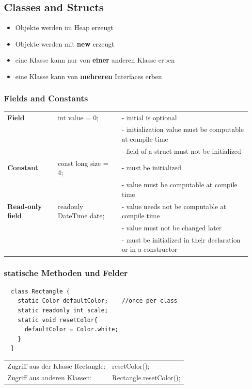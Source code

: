 \subsection{Classes and Structs}

\begin{itemize}
	\item Objekte werden im Heap erzeugt
	\item Objekte werden mit \textbf{new} erzeugt
	\item eine Klasse kann nur von \textbf{einer} anderen Klasse erben
	\item eine Klasse kann von \textbf{mehreren} Interfaces erben
\end{itemize}

\subsubsection{Fields and Constants}

\begin{tabular}{l|l|l}
	\textbf{Field}           & int value = 0;          & - initial is optional                                     \\
	                         &                         & - initialization value must be computable at compile time \\
	                         &                         & - field of a struct must not be initialized               \\ \hline
	\textbf{Constant}        & const long size = 4;     & - must be initialized                                     \\
	                         &                         & - value must be computable at compile time                \\ \hline
	\textbf{Read-only field} & readonly DateTime date; & - value needs not be computable at compile time           \\
	                         &                         & - value must not be changed later \\
	                         &                         & - must be initialized in their declaration or in a constructor \\
\end{tabular} 

\subsubsection{statische Methoden und Felder}
\begin{lstlisting}
  class Rectangle {
    static Color defaultColor;    //once per class
    static readonly int scale;
    static void resetColor{
      defaultColor = Color.white;
    }
  }
\end{lstlisting}
\begin{tabular}{ll}
  Zugriff aus der Klasse Rectangle:  & resetColor();\\
  Zugriff aus anderen Klassen: & Rectangle.resetColor();
\end{tabular}\\


